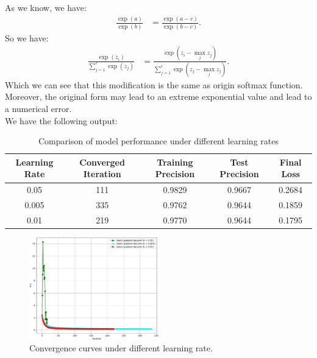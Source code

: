 \documentclass{article}
\begin{document}
\subsection{}
As we know, we have:
\begin{align*}
    \frac{\exp{(a)}}{\exp{(b)}} &= \frac{\exp{(a - c)}}{\exp{(b-c)}}.
\end{align*}
So we have:
\begin{align*}
    \frac{\exp{(z_i)}}{\sum_{j=1}^{c}\exp{(z_j)}} &= \frac{\exp{(z_i - \max\limits_{j}{z_j})}}{\sum_{j=1}^{c}\exp{(z_j - \max\limits_{j}{z_j})}}.
\end{align*}
Which we can see that this modification is the same as origin softmax function.\\ 
Moreover, the original form may lead to an extreme exponential value and lead to a numerical error.\\
We have the following output:\\
\begin{table}[ht]
\centering
\begin{tabular}{|c|c|c|c|c|}
\hline
\textbf{Learning Rate} & \textbf{Converged Iteration} & \textbf{Training Precision} & \textbf{Test Precision} & \textbf{Final Loss} \\
\hline
0.05 & 111 & 0.9829 & 0.9667 & 0.2684 \\
0.005 & 335 & 0.9762 & 0.9644 & 0.1859 \\
0.01 & 219 & 0.9770 & 0.9644 & 0.1795 \\
\hline
\end{tabular}
\caption{Comparison of model performance under different learning rates}
\label{tab:lr_comparison}
\end{table}
\begin{figure}[htpb]
    \begin{center}
        \includegraphics[width=0.5\textwidth]{./figures/logistic_regression_loss.pdf}
    \end{center}
    \caption{Convergence curves under different learning rate.}\label{fig:}
\end{figure}
\end{document}
